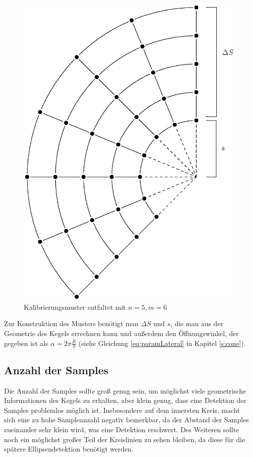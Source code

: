 \begin{figure}[!htb]
	\centering
	\includegraphics[scale=.7]{images/calibrationPattern2.eps}
	\caption{Kalibrierungsmuster entfaltet mit $n = 5, m = 6$}
	\label{fig:calibrationPattern}
\end{figure}

Zur Konstruktion des Musters benötigt man $\Delta S$ und $s$, die man aus der Geometrie des Kegels errechnen kann und außerdem den Öffnungswinkel, der gegeben ist als $\alpha = 2\pi\frac{R}{S}$ (siehe Gleichung \ref{eq:paramLateral} in Kapitel \ref{s:cone}).

\subsection{Anzahl der Samples}
Die Anzahl der Samples sollte groß genug sein, um möglichst viele geometrische Informationen des Kegels zu erhalten, aber klein genug, dass eine Detektion der Samples problemlos möglich ist. Insbesondere auf dem innersten Kreis, macht sich eine zu hohe Sampleanzahl negativ bemerkbar, da der Abstand der Samples zueinander sehr klein wird, was eine Detektion erschwert. Des Weiteren sollte noch ein möglichst großer Teil der Kreislinien zu sehen bleiben, da diese für die spätere Ellipsendetektion benötigt werden.



